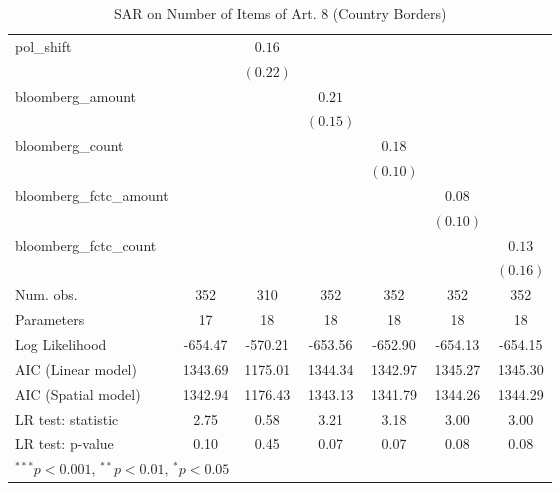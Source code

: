 \begin{table}[!h]
\begin{center}
\begin{tabular}{l c c c c c c }
pol\_shift              &              & $0.16$       &              &              &              &              \\
                        &              & $(0.22)$     &              &              &              &              \\
bloomberg\_amount       &              &              & $0.21$       &              &              &              \\
                        &              &              & $(0.15)$     &              &              &              \\
bloomberg\_count        &              &              &              & $0.18$       &              &              \\
                        &              &              &              & $(0.10)$     &              &              \\
bloomberg\_fctc\_amount &              &              &              &              & $0.08$       &              \\
                        &              &              &              &              & $(0.10)$     &              \\
bloomberg\_fctc\_count  &              &              &              &              &              & $0.13$       \\
                        &              &              &              &              &              & $(0.16)$     \\
\midrule
Num. obs.               & 352          & 310          & 352          & 352          & 352          & 352          \\
Parameters              & 17           & 18           & 18           & 18           & 18           & 18           \\
Log Likelihood          & -654.47      & -570.21      & -653.56      & -652.90      & -654.13      & -654.15      \\
AIC (Linear model)      & 1343.69      & 1175.01      & 1344.34      & 1342.97      & 1345.27      & 1345.30      \\
AIC (Spatial model)     & 1342.94      & 1176.43      & 1343.13      & 1341.79      & 1344.26      & 1344.29      \\
LR test: statistic      & 2.75         & 0.58         & 3.21         & 3.18         & 3.00         & 3.00         \\
LR test: p-value        & 0.10         & 0.45         & 0.07         & 0.07         & 0.08         & 0.08         \\
\bottomrule
\multicolumn{7}{l}{\scriptsize{$^{***}p<0.001$, $^{**}p<0.01$, $^*p<0.05$}}
\end{tabular}
\caption{SAR on Number of Items of Art. 8 (Country Borders)}
\label{table:coefficients}
\end{center}
\end{table}
